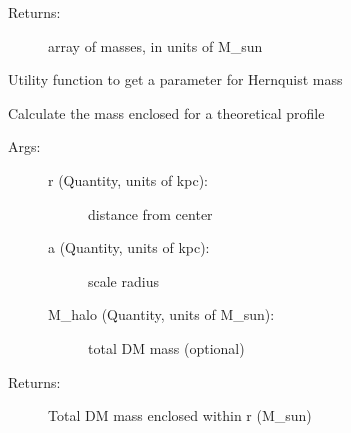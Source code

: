 \documentclass[letterpaper,10pt,english]{sphinxmanual}
\begin{document}
\begin{fulllineitems}
\begin{fulllineitems}
\begin{description}
\item[{Returns:}] \leavevmode
array of masses, in units of M\_sun

\end{description}

\end{fulllineitems}


\begin{fulllineitems}
\label{\detokenize{massprofile:galaxy.massprofile.MassProfile.halo_mass}}
Utility function to get a parameter for Hernquist mass

\end{fulllineitems}


\begin{fulllineitems}
\label{\detokenize{massprofile:galaxy.massprofile.MassProfile.hernquist_mass}}
Calculate the mass enclosed for a theoretical profile
\begin{description}
\item[{Args:}] \leavevmode\begin{description}
\item[{r (Quantity, units of kpc): }] \leavevmode
distance from center

\item[{a (Quantity, units of kpc): }] \leavevmode
scale radius

\item[{M\_halo (Quantity, units of M\_sun): }] \leavevmode
total DM mass (optional)

\end{description}

\item[{Returns:}] \leavevmode
Total DM mass enclosed within r (M\_sun)

\end{description}

\end{fulllineitems}



\end{fulllineitems}
\end{document}
